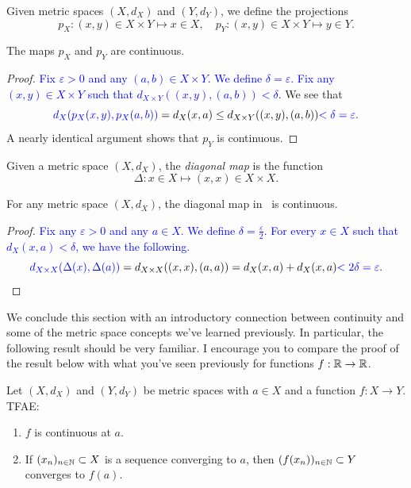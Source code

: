 Given metric spaces $(X,d_X)$ and $(Y,d_Y)$, we define the projections
\[
p_X:(x,y)\in X\times Y \mapsto x \in X,\quad p_Y:(x,y)\in X\times Y \mapsto y\in Y.
\]
\begin{prop}
	The maps $p_X$ and $p_Y$ are continuous.
\end{prop}
\begin{proof}
	\textcolor{blue}{Fix $\varepsilon>0$ and any $(a,b)\in X\times Y$. We define $\delta = \varepsilon$. Fix any $(x,y)\in X\times Y$ such that $d_{X\times Y}((x,y),(a,b))<\delta$.} We see that
	\[
	\textcolor{blue}{d_X(p_X(x,y),p_X(a,b))} = d_X(x,a) \le d_{X\times Y}((x,y),(a,b)) \textcolor{blue}{<\delta = \varepsilon.}
	\]
	A nearly identical argument shows that $p_Y$ is continuous.
\end{proof}
\begin{defn}
	\label{defn:diag_map}
	Given a metric space $(X,d_X)$, the \textit{diagonal map} is the function
	\[
	\Delta : x\in X \mapsto (x,x)\in X\times X.
	\]
\end{defn}
\begin{prop}
	For any metric space $(X,d_X)$, the diagonal map in~ is continuous.
\end{prop}
\begin{proof}
	\textcolor{blue}{Fix any $\varepsilon>0$ and any $a\in X$. We define $\delta = \frac{\varepsilon}{2}$. For every $x\in X$ such that $d_X(x,a) < \delta$, we have the following.}
	\[
	\textcolor{blue}{d_{X\times X}(\Delta(x),\Delta(a))} = d_{X\times X}((x,x),(a,a)) = d_X(x,a) + d_X(x,a) \textcolor{blue}{< 2\delta = \varepsilon.}
	\]
\end{proof}
We conclude this section with an introductory connection between continuity and some of the metric space concepts we've learned previously. In particular, the following result should be very familiar. I encourage you to compare the proof of the result below with what you've seen previously for functions $f:\mathbb{R} \to \mathbb{R}$.
\begin{prop}
	\label{prop:cty_cvg_seq}
	Let $(X,d_X)$ and $(Y,d_Y)$ be metric spaces with $a \in X$ and a function $f:X\to Y$. TFAE:
	\begin{enumerate}
		\item \label{cty_cvg_seq_1} $f$ is continuous at $a$.
		\item \label{cty_cvg_seq_2} If $(x_n)_{n\in\mathbb{N}}\subset X$ is a sequence converging to $a$, then $(f(x_n))_{n\in\mathbb{N}}\subset Y$ converges to $f(a)$.
	\end{enumerate}
\end{prop}
